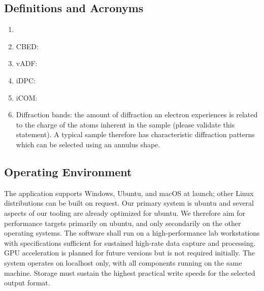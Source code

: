 \documentclass[10pt]{article}
\begin{document}
\subsection{Definitions and Acronyms}
\begin{enumerate}
  \item <expand and define>
  \item CBED:
  \item vADF:
  \item iDPC:
  \item iCOM:
  \item Diffraction bands: the amount of diffraction an electron experiences is related to the charge of the atoms inherent in the sample (please validate this statement). A typical sample therefore has characteristic diffraction patterns which can be selected using an annulus shape.
\end{enumerate}

\subsection{Operating Environment}\label{subsec:operating-environment}
The application supports Windows, Ubuntu, and macOS at launch; other Linux distributions can be built on request. Our primary system is ubuntu and several aspects of our tooling are already optimized for ubuntu. We therefore aim for performance targets primarily on ubuntu, and only secondarily on the other operating systems. The software shall run on a high-performance lab workstations with specifications sufficient for sustained high-rate data capture and processing. GPU acceleration is planned for future versions but is not required initially. The system operates on localhost only, with all components running on the same machine. Storage must sustain the highest practical write speeds for the selected output format.
\end{document}
